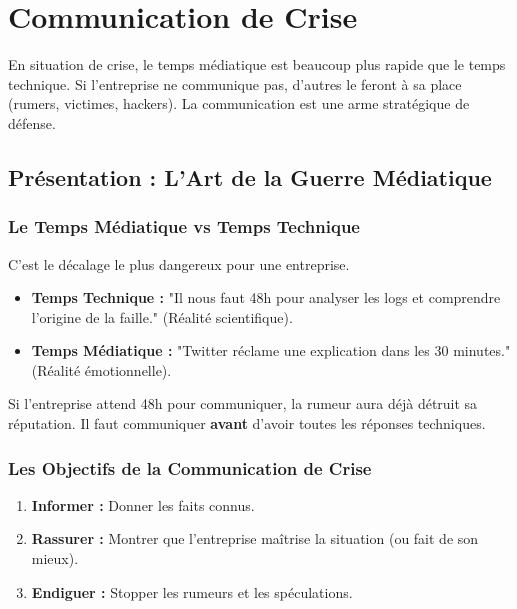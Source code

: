 \chapter{Communication de Crise}
\label{chap:comcrise}

En situation de crise, le temps médiatique est beaucoup plus rapide que le temps technique. Si l'entreprise ne communique pas, d'autres le feront à sa place (rumers, victimes, hackers). La communication est une arme stratégique de défense.

\section{Présentation : L'Art de la Guerre Médiatique}

\subsection{Le Temps Médiatique vs Temps Technique}

C'est le décalage le plus dangereux pour une entreprise.

\begin{itemize}
    \item \textbf{Temps Technique :} "Il nous faut 48h pour analyser les logs et comprendre l'origine de la faille." (Réalité scientifique).
    \item \textbf{Temps Médiatique :} "Twitter réclame une explication dans les 30 minutes." (Réalité émotionnelle).
\end{itemize}

Si l'entreprise attend 48h pour communiquer, la rumeur aura déjà détruit sa réputation. Il faut communiquer \textbf{avant} d'avoir toutes les réponses techniques.

\subsection{Les Objectifs de la Communication de Crise}

\begin{enumerate}
    \item \textbf{Informer :} Donner les faits connus.
    \item \textbf{Rassurer :} Montrer que l'entreprise maîtrise la situation (ou fait de son mieux).
    \item \textbf{Endiguer :} Stopper les rumeurs et les spéculations.
\end{enumerate}

